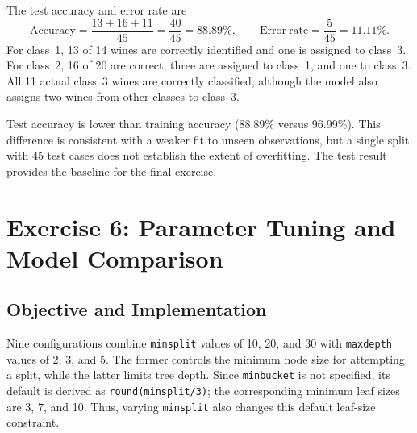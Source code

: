 \documentclass[11pt,a4paper]{article}
\begin{document}
The test accuracy and error rate are
\[
  \mathrm{Accuracy}=\frac{13+16+11}{45}=\frac{40}{45}=88.89\%,
  \qquad
  \mathrm{Error\ rate}=\frac{5}{45}=11.11\%.
\]
For class~1, 13 of 14 wines are correctly identified and one is assigned to class~3. For class~2, 16 of 20 are correct, three are assigned to class~1, and one to class~3. All 11 actual class~3 wines are correctly classified, although the model also assigns two wines from other classes to class~3.

Test accuracy is lower than training accuracy (88.89\% versus 96.99\%). This difference is consistent with a weaker fit to unseen observations, but a single split with 45 test cases does not establish the extent of overfitting. The test result provides the baseline for the final exercise.

\section{Exercise 6: Parameter Tuning and Model Comparison}
\subsection{Objective and Implementation}
Nine configurations combine \texttt{minsplit} values of 10, 20, and 30 with \texttt{maxdepth} values of 2, 3, and 5. The former controls the minimum node size for attempting a split, while the latter limits tree depth. Since \texttt{minbucket} is not specified, its default is derived as \texttt{round(minsplit/3)}; the corresponding minimum leaf sizes are 3, 7, and 10. Thus, varying \texttt{minsplit} also changes this default leaf-size constraint.
\end{document}
